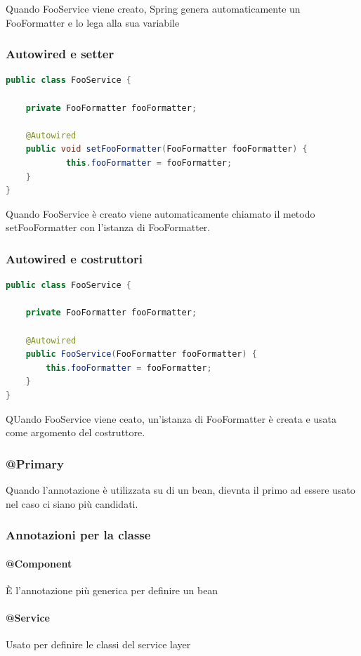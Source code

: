 \documentclass[11pt,a4paper]{book}
\begin{document}
Quando FooService viene creato, Spring genera automaticamente un FooFormatter e lo lega alla sua variabile

\subsubsection{Autowired e setter}
\begin{lstlisting}[language = Java]
public class FooService {
 
    private FooFormatter fooFormatter;
 
    @Autowired
    public void setFooFormatter(FooFormatter fooFormatter) {
            this.fooFormatter = fooFormatter;
    }
}
\end{lstlisting}
Quando FooService è creato viene automaticamente chiamato il metodo setFooFormatter con l'istanza di FooFormatter.

\subsubsection{Autowired e costruttori}
\begin{lstlisting}[language = Java]
public class FooService {
 
    private FooFormatter fooFormatter;
 
    @Autowired
    public FooService(FooFormatter fooFormatter) {
        this.fooFormatter = fooFormatter;
    }
}
\end{lstlisting}
QUando FooService viene ceato, un'istanza di FooFormatter è creata e usata come argomento del costruttore.

\subsubsection{@Primary}
Quando l'annotazione è utilizzata su di un bean, dievnta il primo ad essere usato nel caso ci siano più candidati.

\subsubsection{Annotazioni per la classe}
\paragraph{@Component}
È l'annotazione più generica per definire un bean

\paragraph{@Service}
Usato per definire le classi del service layer
\end{document}
